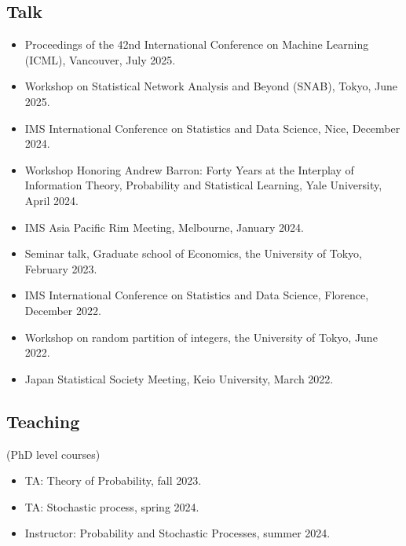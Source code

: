 \documentclass[10pt]{amsart}
\begin{document}
\subsection*{Talk}
\begin{itemize}
  \item Proceedings of the 42nd International Conference on Machine Learning (ICML), Vancouver, July 2025.
  \item  Workshop on Statistical Network Analysis and Beyond (SNAB), Tokyo, June 2025.
  \item  IMS International Conference on Statistics and Data Science, Nice, December 2024. 
  \item  Workshop Honoring Andrew Barron: Forty Years at the Interplay of Information Theory, Probability and Statistical Learning, Yale University, April 2024. 
  \item IMS Asia Pacific Rim Meeting, Melbourne, January 2024. 
  \item Seminar talk, Graduate school of Economics, the University of Tokyo, February 2023. 
  \item IMS International Conference on Statistics and Data Science, Florence, December 2022.
  \item  Workshop on random partition of integers, the University of Tokyo, June 2022.
  \item Japan Statistical Society Meeting, Keio University, March 2022.
\end{itemize}

\subsection*{Teaching} (PhD level courses)
\begin{itemize}
\item TA: Theory of Probability, fall 2023.
\item TA: Stochastic process, spring 2024.
\item Instructor: Probability and Stochastic Processes, summer 2024.
\end{itemize}
\end{document}
